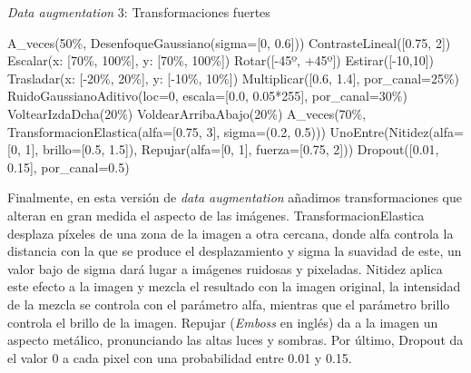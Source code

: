 \begin{algorithm}[H]
    \caption{\textit{Data augmentation} 3: Transformaciones fuertes}
\begin{algorithmic}[1]
    \State A\_veces(50\%, DesenfoqueGaussiano(sigma=[0, 0.6]))
    \State ContrasteLineal([0.75, 2])
    \State Escalar(x: [70\%, 100\%], y: [70\%, 100\%])
    \State Rotar([-45º, +45º])
    \State Estirar([-10,10])
    \State Trasladar(x: [-20\%, 20\%], y: [-10\%, 10\%])
    \State Multiplicar([0.6, 1.4], por\_canal=25\%)
    \State RuidoGaussianoAditivo(loc=0, escala=[0.0, 0.05*255], por\_canal=30\%)
    \State VoltearIzdaDcha(20\%)
    \State VoldearArribaAbajo(20\%)
    \State A\_veces(70\%, TransformacionElastica(alfa=[0.75, 3], sigma=(0.2, 0.5)))
    \State UnoEntre(Nitidez(alfa=[0, 1], brillo=[0.5, 1.5]), Repujar(alfa=[0, 1], fuerza=[0.75, 2]))
    \State Dropout([0.01, 0.15], por\_canal=0.5)
\end{algorithmic}
\end{algorithm}

Finalmente, en esta versión de \textit{data augmentation} añadimos transformaciones que alteran en gran medida el aspecto de las imágenes. TransformacionElastica desplaza píxeles de una zona de la imagen a otra cercana, donde alfa controla la distancia con la que se produce el desplazamiento y sigma la suavidad de este, un valor bajo de sigma dará lugar a imágenes ruidosas y pixeladas. Nitidez aplica este efecto a la imagen y mezcla el resultado con la imagen original, la intensidad de la mezcla se controla con el parámetro alfa, mientras que el parámetro brillo controla el brillo de la imagen. Repujar (\textit{Emboss} en inglés) da a la imagen un aspecto metálico, pronunciando las altas luces y sombras. Por último, Dropout da el valor 0 a cada pixel con una probabilidad entre 0.01 y 0.15. 




